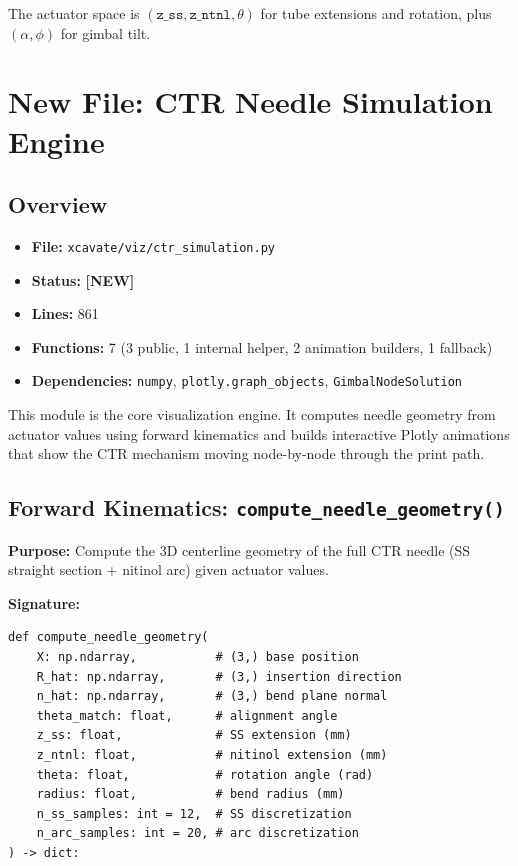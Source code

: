 \documentclass[11pt,a4paper]{article}
\newcommand{\filename}[1]{\texttt{\textcolor{accentblue}{#1}}}
\newcommand{\funcname}[1]{\texttt{\textcolor{codepurple}{#1}}}
\newcommand{\newlabel}{\textcolor{newfile}{\textbf{[NEW]}}}
\begin{document}
The actuator space is $(\texttt{z\_ss}, \texttt{z\_ntnl}, \theta)$ for tube extensions and rotation, plus $(\alpha, \phi)$ for gimbal tilt.

\section{New File: CTR Needle Simulation Engine}
\label{sec:ctr_simulation}

\subsection{Overview}

\begin{itemize}[nosep]
    \item \textbf{File:} \filename{xcavate/viz/ctr\_simulation.py}
    \item \textbf{Status:} \newlabel
    \item \textbf{Lines:} 861
    \item \textbf{Functions:} 7 (3 public, 1 internal helper, 2 animation builders, 1 fallback)
    \item \textbf{Dependencies:} \texttt{numpy}, \texttt{plotly.graph\_objects}, \texttt{GimbalNodeSolution}
\end{itemize}

This module is the core visualization engine. It computes needle geometry from actuator values using forward kinematics and builds interactive Plotly animations that show the CTR mechanism moving node-by-node through the print path.

\subsection{Forward Kinematics: \funcname{compute\_needle\_geometry()}}

\textbf{Purpose:} Compute the 3D centerline geometry of the full CTR needle (SS straight section + nitinol arc) given actuator values.

\textbf{Signature:}
\begin{lstlisting}
def compute_needle_geometry(
    X: np.ndarray,           # (3,) base position
    R_hat: np.ndarray,       # (3,) insertion direction
    n_hat: np.ndarray,       # (3,) bend plane normal
    theta_match: float,      # alignment angle
    z_ss: float,             # SS extension (mm)
    z_ntnl: float,           # nitinol extension (mm)
    theta: float,            # rotation angle (rad)
    radius: float,           # bend radius (mm)
    n_ss_samples: int = 12,  # SS discretization
    n_arc_samples: int = 20, # arc discretization
) -> dict:
\end{lstlisting}
\end{document}

